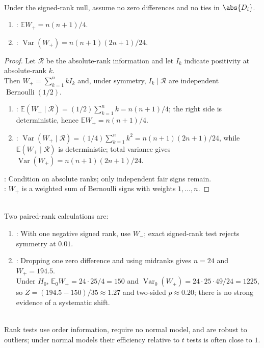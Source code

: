 \begin{theorem} \label{thm:signed-rank-mean-variance} \\
Under the signed-rank null, assume no zero differences and no ties in $\abs{D_i}$.
\begin{enumerate}[label=(\roman*)]
\setlength{\itemsep}{0pt}
\item {}: $\mathbb{E}W_+=n(n+1)/4$.
\item {}: $\operatorname{Var}(W_+)=n(n+1)(2n+1)/24$.
\end{enumerate}
\begin{proof}
Let $\mathcal{R}$ be the absolute-rank information and let $I_k$ indicate positivity at absolute-rank $k$.\\
Then $W_+=\sum_{k=1}^nkI_k$ and, under symmetry, $I_k\mid\mathcal{R}$ are independent $\operatorname{Bernoulli}(1/2)$.
\begin{enumerate}[label=(\roman*)]
\setlength{\itemsep}{0pt}
\item {}: $\mathbb{E}(W_+\mid\mathcal{R})=(1/2)\sum_{k=1}^nk=n(n+1)/4$; the right side is deterministic, hence $\mathbb{E}W_+=n(n+1)/4$.
\item {}: $\operatorname{Var}(W_+\mid\mathcal{R})=(1/4)\sum_{k=1}^nk^2=n(n+1)(2n+1)/24$, while $\mathbb{E}(W_+\mid\mathcal{R})$ is deterministic; total variance gives $\operatorname{Var}(W_+)=n(n+1)(2n+1)/24$.
\end{enumerate}
: Condition on absolute ranks; only independent fair signs remain.\\
: $W_+$ is a weighted sum of Bernoulli signs with weights $1,\ldots,n$.
\end{proof}
\end{theorem}

\begin{example} \label{ex:signed-rank-paired-examples} \\
Two paired-rank calculations are:
\begin{enumerate}[label=(\roman*)]
\setlength{\itemsep}{0pt}
\item {}: With one negative signed rank, use $W_-$; exact signed-rank test rejects symmetry at $0.01$.
\item {}: Dropping one zero difference and using midranks gives $n=24$ and $W_+=194.5$.\\
Under $H_0$, $\mathbb{E}_0W_+=24\cdot25/4=150$ and $\operatorname{Var}_0(W_+)=24\cdot25\cdot49/24=1225$, so $Z=(194.5-150)/35\approx1.27$ and two-sided $p\approx0.20$; there is no strong evidence of a systematic shift.
\end{enumerate}
\end{example}

\begin{remark} \label{rem:rank-tests-versus-normal-theory} \\
Rank tests use order information, require no normal model, and are robust to outliers; under normal models their efficiency relative to $t$ tests is often close to $1$.
\end{remark}
